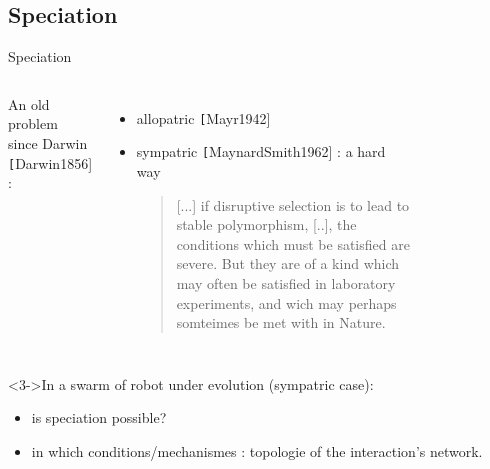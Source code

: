 \documentclass[8pt, handout=show,notes=show]{beamer}
\begin{document}

\subsection{Speciation}


\begin{frame}{Speciation}
	\begin{columns}
			An old problem since Darwin {\scriptsize \texttt [Darwin1856]} :
			\begin{itemize}
				\item allopatric {\scriptsize \texttt [Mayr1942]}
				\item sympatric  {\scriptsize \texttt [MaynardSmith1962] } : a hard way 
				\begin{quotation}
					\small
					[...] if disruptive selection is to lead to stable polymorphism, [..], the conditions which must be satisfied are severe. But they are of a kind which may often be satisfied in laboratory experiments, and wich may perhaps somteimes be met with in Nature.
				\end{quotation}

			\end{itemize}
			\begin{figure}
					\label{figa:specAl} 
				\hspace{.2cm}
					\label{figa:specSy} 
			\end{figure}
	\end{columns}
	\begin{alertblock}<3->{In a swarm of robot under evolution (sympatric case):}
		\begin{itemize}
			\item is speciation possible?
			\item in which conditions/mechanismes : topologie of the interaction's network.

		\end{itemize}
	\end{alertblock}
\end{frame}
\end{document}
